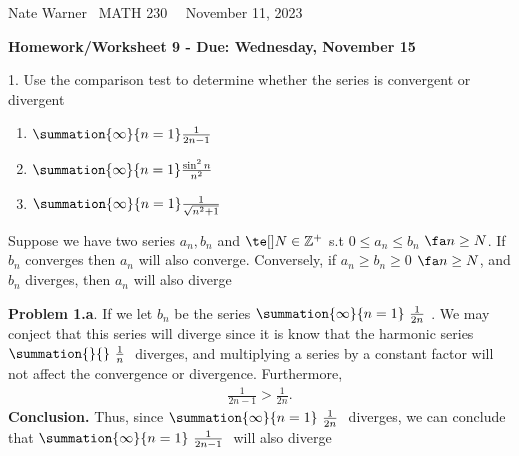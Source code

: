 \documentclass{report}
\title{\Huge{}}
\author{\huge{Nathan Warner}}
\date{\huge{}}
\begin{document}
    \pagebreak \bigbreak \noindent
    Nate Warner \ \quad \quad \quad \quad \quad \quad \quad \quad \quad \quad \quad \quad \quad \quad \quad \quad \quad  MATH 230 \quad  \quad \quad \quad \quad \quad \quad \quad \quad \ \ \quad \quad November 11, 2023
    \begin{center}
        \textbf{Homework/Worksheet 9 - Due: Wednesday, November 15}
    \end{center}
    \bigbreak \noindent 
    \begin{mdframed}
        1. Use the comparison test to determine whether the series is convergent or divergent
        \begin{enumerate}[label=(\alph*)]
            \item $\summation{\infty}{n=1}\frac{1}{2n-1}$ 
            \item $\summation{\infty}{n=1}\frac{\sin^{2}{n}}{n^{2}}$
            \item $\summation{\infty}{n=1}\frac{1}{\sqrt{n^{2}+1}}$
        \end{enumerate}
    \end{mdframed}

    \bigbreak \noindent 
    \begin{remark}
        Suppose we have two series $a_{n}, b_{n}$ and $\te[]N \in \mathbb{Z^{+}}$ s.t $0 \leq a_{n} \leq b_{n}$ $\fa n \geq N$. If $b_{n}$ converges then $a_{n}$ will also converge. Conversely, if $a_{n} \geq b_{n} \geq 0$ $\fa n \geq N $, and $b_{n}$ diverges, then $a_{n}$ will also diverge
    \end{remark}
    

    \bigbreak \noindent 
    \textbf{Problem 1.a}. If we let $b_{n}$ be the series $\summation{\infty}{n=1}\ \frac{1}{2n}\ $. We may conject that this series will diverge since it is know that the harmonic series $\summation{}{}\ \frac{1}{n}\  $ diverges, and multiplying a series by a constant factor will not affect the convergence or divergence. Furthermore, 
    \begin{align*}
        \frac{1}{2n-1} > \frac{1}{2n}
    .\end{align*}
    \bigbreak \noindent 
    \textbf{Conclusion.} Thus, since $\summation{\infty}{n=1}\ \frac{1}{2n}\  $ diverges, we can conclude that $\summation{\infty}{n=1}\ \frac{1}{2n-1}\  $ will also diverge
\end{document}
